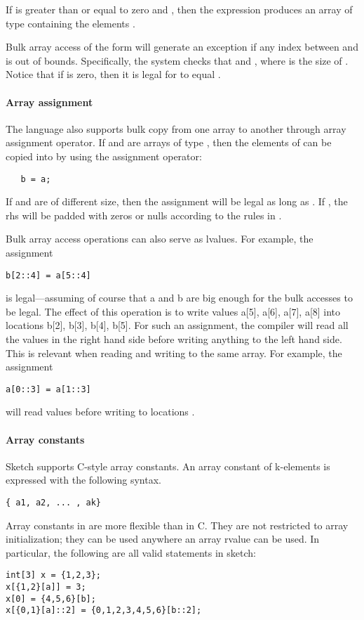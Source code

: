 If  is greater than or equal to zero and , then the expression  produces an array of type  containing the elements . 

Bulk array access of the form  will generate an exception if any index between  and  is out of bounds. Specifically, the system checks that  and , where  is the size of . Notice that if  is zero, then it is legal for  to equal .

\paragraph{Array assignment}
The language also supports bulk copy from one array to another through array assignment operator. If  and  are arrays of type , then the elements of   can be copied into  by using the assignment operator: 
\begin{lstlisting}
   b = a;
\end{lstlisting}
If  and  are of different size, then the assignment will be legal as long as . If , the rhs will be padded with zeros or nulls according to the rules in .

Bulk array access operations can also serve as lvalues. For example, the assignment 
\begin{lstlisting}
b[2::4] = a[5::4] 
\end{lstlisting}
is legal---assuming of course that a and b are big enough for the bulk accesses to be legal. The effect of this operation is to write values a[5], a[6], a[7], a[8] into locations b[2], b[3], b[4], b[5]. For such an assignment, the compiler will read all the values in the right hand side before writing anything to the left hand side. This is relevant when reading and writing to the same array. For example, the assignment 
\begin{lstlisting}
a[0::3] = a[1::3] 
\end{lstlisting}
will read values   before writing to locations  .

\paragraph{Array constants}
Sketch supports C-style array constants. An array constant of k-elements is expressed with the following syntax.
\begin{lstlisting}
{ a1, a2, ... , ak}
\end{lstlisting}
Array constants in \Sk{} are more flexible than in C. They are not restricted to array initialization; they can be used anywhere an array rvalue can be used. In particular, the following are all valid statements in sketch:
\begin{lstlisting}
int[3] x = {1,2,3};
x[{1,2}[a]] = 3;
x[0] = {4,5,6}[b];
x[{0,1}[a]::2] = {0,1,2,3,4,5,6}[b::2];
\end{lstlisting}

